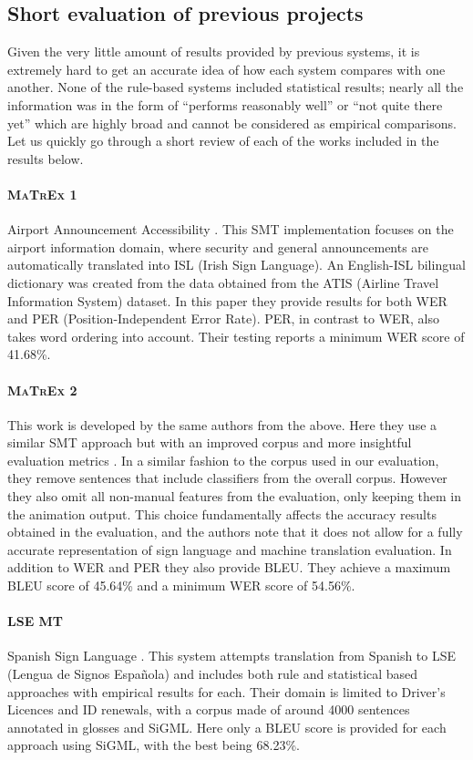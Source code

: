 \documentclass[12pt]{ociamthesis}  %
\begin{document}
\subsection{Short evaluation of previous projects}
\label{previous-results}
Given the very little amount of results provided by previous systems, it is extremely hard to get an accurate idea of how each system compares with one another. None of the rule-based systems included statistical results; nearly all the information was in the form of ``performs reasonably well'' or ``not quite there yet'' which are highly broad and cannot be considered as empirical comparisons. Let us quickly go through a short review of each of the works included in the results below.

\paragraph*{\textsc{MaTrEx} 1} Airport Announcement Accessibility . This SMT implementation focuses on the airport information domain, where security and general announcements are automatically translated into ISL (Irish Sign Language). An English-ISL bilingual dictionary was created from the data obtained from the ATIS (Airline Travel Information System) dataset. In this paper they provide results for both WER and PER (Position-Independent Error Rate). PER, in contrast to WER, also takes word ordering into account. Their testing reports a minimum WER score of 41.68\%.

\paragraph*{\textsc{MaTrEx} 2} This work is developed by the same authors from the above. Here they use a similar SMT approach but with an improved corpus and more insightful evaluation metrics . In a similar fashion to the corpus used in our evaluation, they remove sentences that include classifiers from the overall corpus. However they also omit all non-manual features from the evaluation, only keeping them in the animation output. This choice fundamentally affects the accuracy results obtained in the evaluation, and the authors note that it does not allow for a fully accurate representation of sign language and machine translation evaluation. In addition to WER and PER they also provide BLEU. They achieve a maximum BLEU score of 45.64\% and a minimum WER score of 54.56\%.

\paragraph*{LSE MT} Spanish Sign Language . This system attempts translation from Spanish to LSE (Lengua de Signos Espa\~nola) and includes both rule and statistical based approaches with empirical results for each. Their domain is limited to Driver's Licences and ID renewals, with a corpus made of around 4000 sentences annotated in glosses and SiGML. Here only a BLEU score is provided for each approach using SiGML, with the best being 68.23\%.
\end{document}
